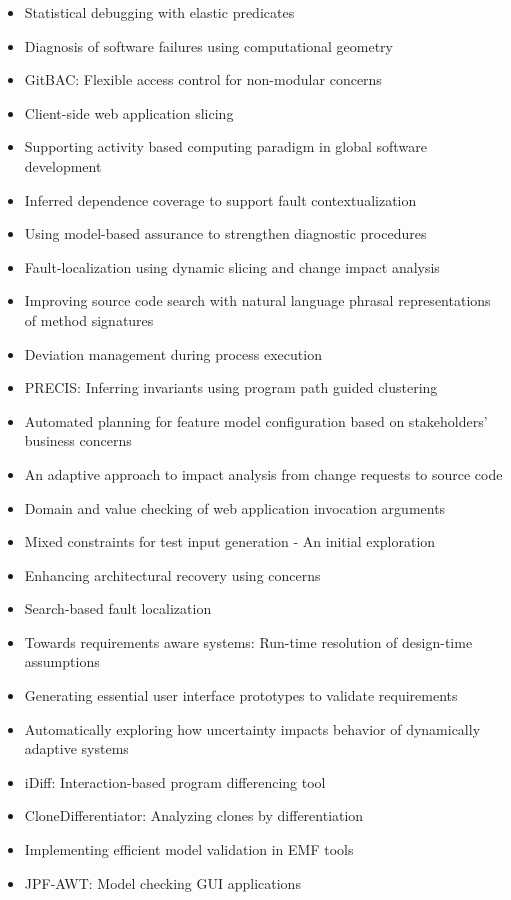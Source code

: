 {\begin{itemize}[itemsep=-1ex]
  \item Statistical debugging with elastic predicates
  \item Diagnosis of software failures using computational geometry
  \item GitBAC: Flexible access control for non-modular concerns
  \item Client-side web application slicing
  \item Supporting activity based computing paradigm in global software development
  \item Inferred dependence coverage to support fault contextualization
  \item Using model-based assurance to strengthen diagnostic procedures
  \item Fault-localization using dynamic slicing and change impact analysis
  \item Improving source code search with natural language phrasal representations of method signatures
  \item Deviation management during process execution
  \item PRECIS: Inferring invariants using program path guided clustering
  \item Automated planning for feature model configuration based on stakeholders' business concerns
  \item An adaptive approach to impact analysis from change requests to source code
  \item Domain and value checking of web application invocation arguments
  \item Mixed constraints for test input generation - An initial exploration
  \item Enhancing architectural recovery using concerns
  \item Search-based fault localization
  \item Towards requirements aware systems: Run-time resolution of design-time assumptions
  \item Generating essential user interface prototypes to validate requirements
  \item Automatically exploring how uncertainty impacts behavior of dynamically adaptive systems
  \item iDiff: Interaction-based program differencing tool
  \item CloneDifferentiator: Analyzing clones by differentiation
  \item Implementing efficient model validation in EMF tools
  \item JPF-AWT: Model checking GUI applications

\end{itemize}}
